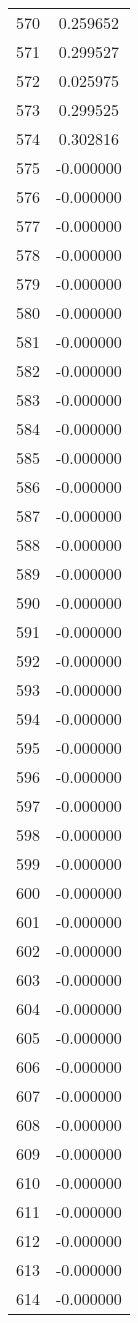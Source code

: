 \documentclass[12pt]{article}
\begin{document}
\begin{longtable}{@{}cc@{}}
570 & 0.259652 \\
571 & 0.299527 \\
572 & 0.025975 \\
573 & 0.299525 \\
574 & 0.302816 \\
575 & -0.000000 \\
576 & -0.000000 \\
577 & -0.000000 \\
578 & -0.000000 \\
579 & -0.000000 \\
580 & -0.000000 \\
581 & -0.000000 \\
582 & -0.000000 \\
583 & -0.000000 \\
584 & -0.000000 \\
585 & -0.000000 \\
586 & -0.000000 \\
587 & -0.000000 \\
588 & -0.000000 \\
589 & -0.000000 \\
590 & -0.000000 \\
591 & -0.000000 \\
592 & -0.000000 \\
593 & -0.000000 \\
594 & -0.000000 \\
595 & -0.000000 \\
596 & -0.000000 \\
597 & -0.000000 \\
598 & -0.000000 \\
599 & -0.000000 \\
600 & -0.000000 \\
601 & -0.000000 \\
602 & -0.000000 \\
603 & -0.000000 \\
604 & -0.000000 \\
605 & -0.000000 \\
606 & -0.000000 \\
607 & -0.000000 \\
608 & -0.000000 \\
609 & -0.000000 \\
610 & -0.000000 \\
611 & -0.000000 \\
612 & -0.000000 \\
613 & -0.000000 \\
614 & -0.000000 \\

\end{longtable}
\end{document}
